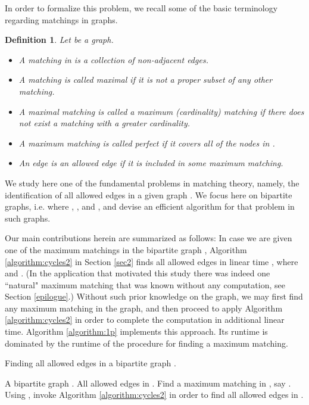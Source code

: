 \documentclass[times, 11pt]{article}
\newtheorem{definition}[theorem]{Definition}
\begin{document}
In order to formalize this problem, we recall some of the basic terminology regarding matchings in graphs.

\newpage
\begin{definition}\label{def1} Let  be a graph.
\begin{itemize}
\item A matching in  is a collection  of non-adjacent edges.
\item A matching  is called maximal if it is not a proper subset of any other matching.
\item A maximal matching  is called a maximum (cardinality) matching if there does not exist a matching with a greater cardinality.
\item A maximum matching  is called perfect if it covers all of the nodes in .
\item An edge  is an allowed edge if it is included in some maximum matching.
\end{itemize}
\end{definition}

We study here one of the fundamental problems in matching theory, namely,
the identification of all allowed edges in a given graph .
We focus here on bipartite graphs, i.e.  where , , and ,
and devise an efficient algorithm for that problem in such graphs.


\smallskip
Our main contributions herein are summarized as follows:
In case we are given one of the maximum matchings in the bipartite graph , Algorithm \ref{algorithm:cycles2} in
Section \ref{sec2}
finds all allowed edges in linear time , where  and . (In the application that motivated this study there was indeed
one ``natural" maximum matching that was known without any computation, see Section \ref{epilogue}.)
Without such prior knowledge on the graph, we may first find any maximum matching in the graph, and then proceed to apply
Algorithm \ref{algorithm:cycles2} in order to complete the computation in additional linear time.
Algorithm \ref{algorithm:1p} implements this approach. Its runtime is dominated by the runtime of the procedure for finding
a maximum matching.

\begin{algorithm}[h!!]
\caption{\label{algorithm:1p} Finding all allowed edges in a bipartite graph .}
\begin{algorithmic}[1]
\INPUT A bipartite graph .
\OUTPUT All allowed edges in .
\STATE Find a maximum matching in , say .
\STATE Using , invoke Algorithm \ref{algorithm:cycles2} in order to find all allowed edges in .
\end{algorithmic}
\end{algorithm}
\end{document}
